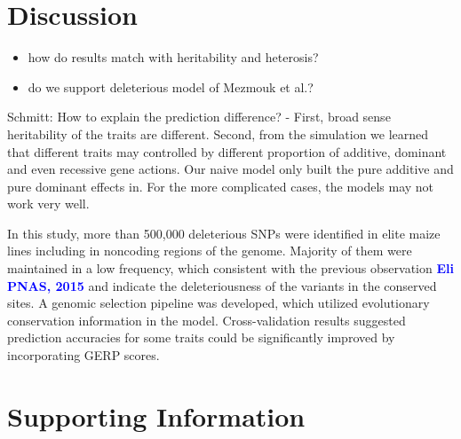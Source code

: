 \documentclass[9pt,twocolumn,twoside]{gsajnl}
\newcommand{\yang}[1]{\textcolor{blue}{\bf #1}}
\newcommand{\beginsupplement}{%
        \setcounter{table}{0}
        \renewcommand{\thetable}{S\arabic{table}}%
        \setcounter{figure}{0}
        \renewcommand{\thefigure}{S\arabic{figure}}%
     }
\begin{document}
\section*{Discussion}

\begin{itemize}
  \item how do results match with heritability and heterosis?
  \item do we support deleterious model of Mezmouk et al.?
\end{itemize}

Schmitt: How to explain the prediction difference?  
- First, broad sense heritability of the traits are different. Second, from the simulation we learned that different traits may controlled by different proportion of additive, dominant and even recessive gene actions. Our naive model only built the pure additive and pure dominant effects in. For the more complicated cases, the models may not work very well.

In this study, more than 500,000 deleterious SNPs were identified in elite maize lines including in noncoding regions of the genome. Majority of them were maintained in a low frequency, which consistent with the previous observation \yang{Eli PNAS, 2015} and indicate the deleteriousness of the variants in the conserved sites. A genomic selection pipeline was developed, which utilized evolutionary conservation information in the model.
Cross-validation results suggested prediction accuracies for some traits could be significantly improved by incorporating GERP scores. 



\clearpage



\pagebreak
\beginsupplement
\section*{Supporting Information}
\end{document}
